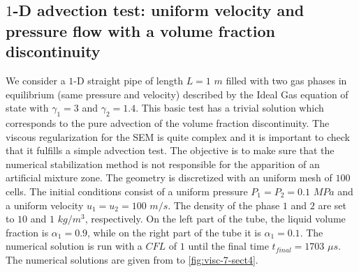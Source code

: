 \subsection{$1$-D advection test: uniform velocity and pressure flow with a volume fraction discontinuity}\label{sec:1d-advection-7-eq-sct4}
We consider a $1$-D straight pipe of length $L=1$ $m$ filled with two gas phases in equilibrium (same pressure and velocity) described by the Ideal Gas equation of state with $\gamma_1 = 3$ and $\gamma_2 = 1.4$. This basic test has a trivial solution which corresponds to the pure advection of the volume fraction discontinuity. The viscous regularization for the SEM is quite complex and it is important to check that it fulfills a simple advection test. The objective is to make sure that the numerical stabilization method is not responsible for the apparition of an artificial mixture zone. The geometry is discretized with an uniform mesh of $100$ cells. The initial conditions consist of a uniform pressure $P_1 = P_2 =0.1$ $MPa$ and a uniform velocity $u_1 = u_2 = 100$ $m/s$. The density of the phase $1$ and $2$ are set to $10$ and $1$ $kg/m^3$, respectively. On the left part of the tube, the liquid volume fraction is $\alpha_{1} = 0.9$, while on the right part of the tube it is $\alpha_{1} = 0.1$. The numerical solution is run with a $CFL$ of $1$ until the final time $t_{final} = 1703 $ $\mu s$. The numerical solutions are given from  to \ref{fig:visc-7-sect4}.
%
